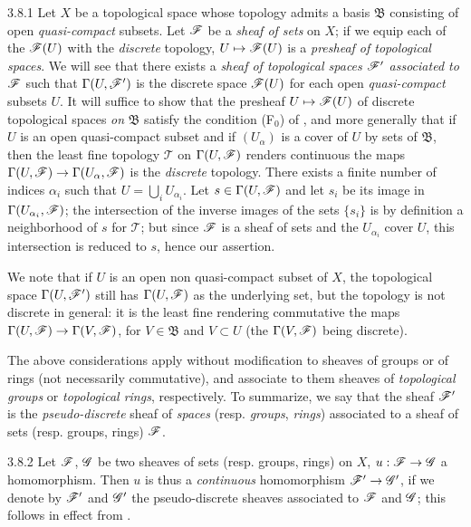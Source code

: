\begin{env}{3.8.1}
\label{env-0.3.8.1}
Let $X$ be a topological space whose topology admits a basis $\mathfrak{B}$
consisting of open \emph{quasi-compact} subsets. Let $\mathscr{F}$ be a \emph{sheaf
of sets} on $X$; if we equip each of the $\mathscr{F}(U)$ with the \emph{discrete}
topology, $U\mapsto\mathscr{F}(U)$ is a \emph{presheaf of topological spaces}. We
will see that there exists a \emph{sheaf of topological spaces $\mathscr{F}'$
associated to $\mathscr{F}$}  such that $\Gamma(U,\mathscr{F}')$ is the
discrete space $\mathscr{F}(U)$ for each open \emph{quasi-compact} subsets $U$. It
will suffice to show that the presheaf $U\mapsto\mathscr{F}(U)$ of discrete
topological spaces \emph{on} $\mathfrak{B}$ satisfy the condition (F$_0$) of
, and more generally that if $U$ is an open quasi-compact
subset and if $(U_\alpha)$ is a cover of $U$ by sets of $\mathfrak{B}$, then the
least fine topology $\mathscr{T}$ on $\Gamma(U,\mathscr{F})$ renders continuous the
maps $\Gamma(U,\mathscr{F})\to\Gamma(U_\alpha,\mathscr{F})$ is the \emph{discrete}
topology. There exists a finite number of indices $\alpha_i$ such that
$U=\bigcup_i U_{\alpha_i}$. Let $s\in\Gamma(U,\mathscr{F})$ and let $s_i$ be its
image in $\Gamma(U_{\alpha_i},\mathscr{F})$; the intersection of the inverse images
of the sets $\{s_i\}$ is by definition a neighborhood of $s$ for $\mathscr{T}$;
but since $\mathscr{F}$ is a sheaf of sets and the $U_{\alpha_i}$ cover $U$, this
intersection is reduced to $s$, hence our assertion.

We note that if $U$ is an open non quasi-compact subset of $X$, the topological
space $\Gamma(U,\mathscr{F}')$ still has $\Gamma(U,\mathscr{F})$ as the underlying set,
but the topology is not discrete in general: it is the least fine rendering
commutative the maps $\Gamma(U,\mathscr{F})\to\Gamma(V,\mathscr{F})$, for
$V\in\mathfrak{B}$ and $V\subset U$ (the $\Gamma(V,\mathscr{F})$ being discrete).

The above considerations apply without modification to sheaves of groups or of
rings (not necessarily commutative), and associate to them sheaves of
\emph{topological groups} or \emph{topological rings}, respectively. To
summarize, we say that the sheaf $\mathscr{F}'$ is the \emph{pseudo-discrete} sheaf
of \emph{spaces} (resp. \emph{groups}, \emph{rings}) associated to a sheaf of
sets (resp. groups, rings) $\mathscr{F}$.
\end{env}

\begin{env}{3.8.2}
\label{env-0.3.8.2}
Let $\mathscr{F}$, $\mathscr{G}$ be two sheaves of sets (resp. groups, rings) on $X$,
$u:\mathscr{F}\to\mathscr{G}$ a homomorphism. Then $u$ is thus a \emph{continuous}
homomorphism $\mathscr{F}'\to\mathscr{G}'$, if we denote by $\mathscr{F}'$ and $\mathscr{G}'$ the
pseudo-discrete sheaves associated to $\mathscr{F}$ and $\mathscr{G}$; this follows in
effect from .
\end{env}

